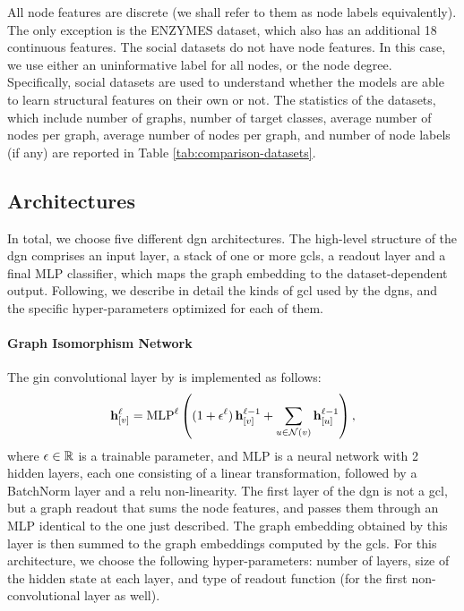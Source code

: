 All node features are discrete (we shall refer to them as node labels equivalently). The only exception is the ENZYMES dataset, which also has an additional 18 continuous features. The social datasets do not have node features. In this case, we use either an uninformative label for all nodes, or the node degree. Specifically, social datasets are used to understand whether the models are able to learn structural features on their own or not. The statistics of the datasets, which include number of graphs, number of target classes, average number of nodes per graph, average number of nodes per graph, and number of node labels (if any) are reported in Table \ref{tab:comparison-datasets}.


\subsection{Architectures}\label{sec:comparison-architectures}
In total, we choose five different \gls{dgn} architectures. The high-level structure of the \gls{dgn} comprises an input layer, a stack of one or more \glspl{gcl}, a readout layer and a final MLP classifier, which maps the graph embedding to the dataset-dependent output. Following, we describe in detail the kinds of \gls{gcl} used by the \glspl{dgn}, and the specific hyper-parameters optimized for each of them.

\paragraph{Graph Isomorphism Network} The \gls{gin} convolutional layer by \cite{xu2019gin} is implemented as follows:
$$\Elem{h}{v}^{\ell} = \Fun{MLP}^{\ell} \Paren{(1 + \epsilon^{\ell})\,\Elem{h}{v}^{\ell-1} + \sum_{u \in \Cal{N}(v)} \Elem{h}{u}^{\ell-1}},$$
where $\epsilon \in \mathbb{R}$ is a trainable parameter, and MLP is a neural network with 2 hidden layers, each one consisting of a linear transformation, followed by a BatchNorm layer and a \gls{relu} non-linearity. The first layer of the \gls{dgn} is not a \gls{gcl}, but a graph readout that sums the node features, and passes them through an MLP identical to the one just described. The graph embedding obtained by this layer is then summed to the graph embeddings computed by the \glspl{gcl}. For this architecture, we choose the following hyper-parameters: number of layers, size of the hidden state at each layer, and type of readout function (for the first non-convolutional layer as well).

